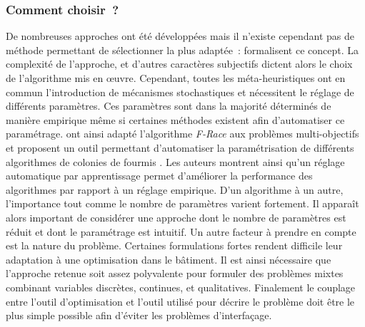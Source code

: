 \subsubsection{Comment choisir~?} %
\label{ssub:comment_choisir}
De nombreuses approches ont été développées mais il n’existe cependant pas de
méthode permettant de sélectionner la plus adaptée~: \textcite{Wolpert199767}
formalisent ce concept. La complexité de l’approche, et d’autres caractères
subjectifs dictent alors le choix de l’algorithme mis en œuvre. Cependant, toutes
les méta-heuristiques ont en commun l’introduction de mécanismes stochastiques
et nécessitent le réglage de différents paramètres. Ces paramètres sont dans la
majorité déterminés de manière empirique même si certaines méthodes
existent afin d’automatiser ce paramétrage. \textcite{Lopez-Ibanez2012861} ont ainsi
adapté l’algorithme \textit{F-Race} \parencite{Birattari2010311} aux problèmes
multi-objectifs et proposent un outil permettant d’automatiser la paramétrisation de
différents algorithmes de colonies de fourmis \parencite{Lopez-Ibanez2012861}.
Les auteurs montrent ainsi qu’un réglage automatique par apprentissage permet
d’améliorer la performance des algorithmes par rapport à un réglage empirique.
D’un algorithme à un autre, l’importance tout comme le nombre de paramètres
varient fortement. Il apparaît alors important de considérer une approche dont le
nombre de paramètres est réduit et dont le paramétrage est intuitif. Un autre
facteur à prendre en compte est la nature du problème. Certaines formulations
fortes rendent difficile leur adaptation à une optimisation dans le bâtiment. Il
est ainsi nécessaire que l’approche retenue soit assez polyvalente pour formuler des
problèmes mixtes combinant variables discrètes, continues, et qualitatives.
Finalement le couplage entre l’outil d’optimisation et l’outil utilisé pour
décrire le problème doit être le plus simple possible afin d’éviter les
problèmes d’interfaçage.

